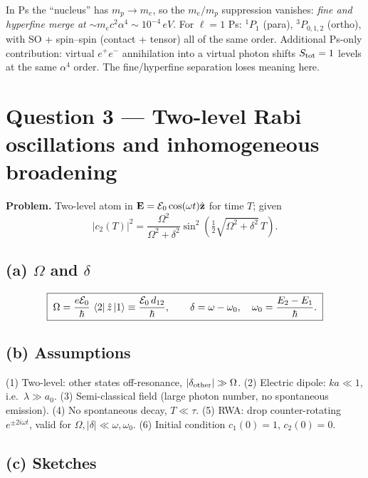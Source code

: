 \documentclass[11pt]{article}
\begin{document}
In Ps the ``nucleus'' has $m_p\to m_e$, so the $m_e/m_p$ suppression vanishes: \emph{fine and hyperfine merge at} $\sim m_e c^2\alpha^4\sim 10^{-4}\,\si{eV}$. For $\ell=1$ Ps: $^1P_1$ (para), $^3P_{0,1,2}$ (ortho), with SO + spin--spin (contact + tensor) all of the same order. Additional Ps-only contribution: virtual $e^+e^-$ annihilation into a virtual photon shifts $S_{\rm tot}=1$ levels at the same $\alpha^4$ order. The fine/hyperfine separation loses meaning here.

\section*{Question 3 --- Two-level Rabi oscillations and inhomogeneous broadening}

\textbf{Problem.} Two-level atom in $\vb E=\mathcal E_0\cos(\omega t)\hat{\vb z}$ for time $T$; given
\begin{equation}
|c_2(T)|^{2} = \frac{\Omega^{2}}{\Omega^{2}+\delta^{2}}\sin^{2}\!\left(\tfrac12\sqrt{\Omega^{2}+\delta^{2}}\,T\right).
\label{eq:rabiformula}
\end{equation}

\subsection*{(a) $\Omega$ and $\delta$}

\begin{equation}
\boxed{\;\Omega = \frac{e\mathcal E_0}{\hbar}\,\bra{2}\hat z\ket{1} \equiv \frac{\mathcal E_0\, d_{12}}{\hbar},\qquad \delta=\omega-\omega_0,\quad \omega_0=\frac{E_2-E_1}{\hbar}.\;}
\end{equation}

\subsection*{(b) Assumptions}

(1) Two-level: other states off-resonance, $|\delta_{\rm other}|\gg\Omega$. (2) Electric dipole: $ka\ll 1$, i.e.\ $\lambda\gg a_0$. (3) Semi-classical field (large photon number, no spontaneous emission). (4) No spontaneous decay, $T\ll\tau$. (5) RWA: drop counter-rotating $e^{\pm 2i\omega t}$, valid for $\Omega,|\delta|\ll\omega,\omega_0$. (6) Initial condition $c_1(0)=1$, $c_2(0)=0$.

\subsection*{(c) Sketches}
\end{document}
